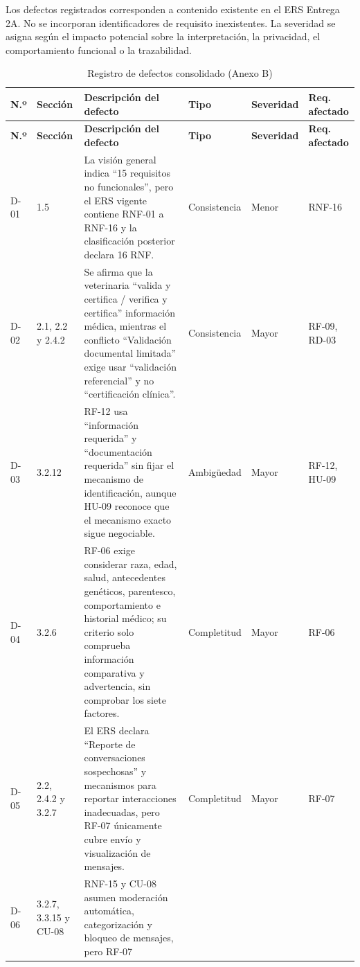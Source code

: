 \documentclass[journal,onecolumn]{IEEEtran}
\begin{document}
	Los defectos registrados corresponden a contenido existente en el ERS Entrega 2A. No se incorporan
	identificadores de requisito inexistentes. La severidad se asigna según el impacto potencial sobre
	la interpretación, la privacidad, el comportamiento funcional o la trazabilidad.
	
	\begin{longtable}{C{1.0cm} L{2.0cm} L{4.6cm} L{1.9cm} L{1.7cm} L{1.8cm}}
		\caption{Registro de defectos consolidado (Anexo B)}\label{tab:defectos}\\
		\toprule
		\textbf{N.º} & \textbf{Sección} & \textbf{Descripción del defecto} & \textbf{Tipo} &
		\textbf{Severidad} & \textbf{Req. afectado} \\
		\midrule
		\endfirsthead
		\toprule
		\textbf{N.º} & \textbf{Sección} & \textbf{Descripción del defecto} & \textbf{Tipo} &
		\textbf{Severidad} & \textbf{Req. afectado} \\
		\midrule
		\endhead
		\bottomrule
		\endfoot
		D-01 & 1.5 &
		La visión general indica ``15 requisitos no funcionales'', pero el ERS vigente contiene RNF-01
		a RNF-16 y la clasificación posterior declara 16 RNF. & Consistencia & Menor & RNF-16 \\
		\addlinespace
		D-02 & 2.1, 2.2 y 2.4.2 &
		Se afirma que la veterinaria ``valida y certifica / verifica y certifica'' información médica,
		mientras el conflicto ``Validación documental limitada'' exige usar ``validación referencial''
		y no ``certificación clínica''. & Consistencia & Mayor & RF-09, RD-03 \\
		\addlinespace
		D-03 & 3.2.12 &
		RF-12 usa ``información requerida'' y ``documentación requerida'' sin fijar el mecanismo de
		identificación, aunque HU-09 reconoce que el mecanismo exacto sigue negociable. & Ambigüedad &
		Mayor & RF-12, HU-09 \\
		\addlinespace
		D-04 & 3.2.6 &
		RF-06 exige considerar raza, edad, salud, antecedentes genéticos, parentesco, comportamiento e
		historial médico; su criterio solo comprueba información comparativa y advertencia, sin
		comprobar los siete factores. & Completitud & Mayor & RF-06 \\
		\addlinespace
		D-05 & 2.2, 2.4.2 y 3.2.7 &
		El ERS declara ``Reporte de conversaciones sospechosas'' y mecanismos para reportar
		interacciones inadecuadas, pero RF-07 únicamente cubre envío y visualización de mensajes. &
		Completitud & Mayor & RF-07 \\
		\addlinespace
		D-06 & 3.2.7, 3.3.15 y CU-08 &
		RNF-15 y CU-08 asumen moderación automática, categorización y bloqueo de mensajes, pero RF-07

\end{longtable}
\end{document}
